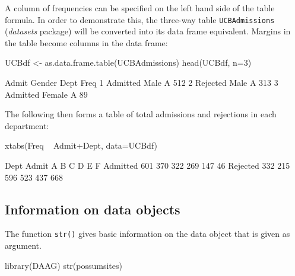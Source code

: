 \documentclass{tufte-book}\usepackage[]{graphicx}\usepackage[]{color}
\newcommand{\txtt}[1]{\texttt{#1}}
\begin{document}
A column of frequencies can be specified on the left hand side of the
table formula. In order to demonstrate this, the three-way table
\txtt{UCBAdmissions} ({\em datasets} package) will be converted into
its data frame equivalent.  Margins in the table become columns in
the data frame:
\begin{Schunk}
\begin{Sinput}
UCBdf <- as.data.frame.table(UCBAdmissions)
head(UCBdf, n=3)
\end{Sinput}
\begin{Soutput}
     Admit Gender Dept Freq
1 Admitted   Male    A  512
2 Rejected   Male    A  313
3 Admitted Female    A   89
\end{Soutput}
\end{Schunk}

The following then forms a table of total admissions and rejections
in each department:
\begin{Schunk}
\begin{Sinput}
xtabs(Freq ~  Admit+Dept, data=UCBdf)
\end{Sinput}
\begin{Soutput}
          Dept
Admit        A   B   C   D   E   F
  Admitted 601 370 322 269 147  46
  Rejected 332 215 596 523 437 668
\end{Soutput}
\end{Schunk}


\subsection*{Information on data objects}

The function \txtt{str()} gives basic information on the data object that
is given as argument.
\begin{Schunk}
\begin{Sinput}
library(DAAG)
str(possumsites)
\end{Sinput}
\end{Schunk}
\end{document}
